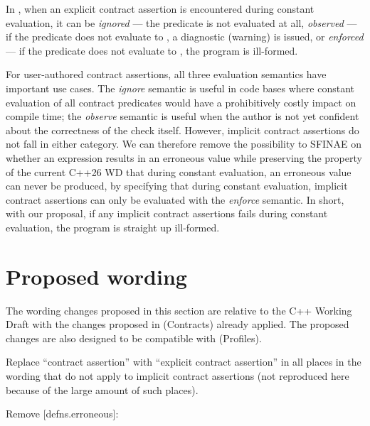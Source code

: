 In \cite{P2900R13}, when an explicit contract assertion is encountered during constant evaluation, it can be \emph{ignored} --- the predicate is not evaluated at all, \emph{observed} --- if the predicate does not evaluate to , a diagnostic (warning) is issued, or \emph{enforced} --- if the predicate does not evaluate to , the program is ill-formed.

For user-authored contract assertions, all three evaluation semantics have important use cases. The \emph{ignore} semantic is useful in code bases where constant evaluation of all contract predicates would have a prohibitively costly impact on compile time; the \emph{observe} semantic is useful when the author is not yet confident about the correctness of the check itself. However, implicit contract assertions do not fall in either category. We can therefore remove the possibility to SFINAE on whether an expression results in an erroneous value while preserving the property of the current C++26 WD that during constant evaluation, an erroneous value can never be produced, by specifying that during constant evaluation, implicit contract assertions can only be evaluated with the \emph{enforce} semantic. In short, with our proposal, if any implicit contract assertions fails during constant evaluation, the program is straight up ill-formed.

\section{Proposed wording}

The wording changes proposed in this section are relative to the C++ Working Draft \cite{N5001} with the changes proposed in \cite{P2900R13} (Contracts) already applied. The proposed changes are also designed to be compatible with \cite{P3081R1} (Profiles).


Replace ``contract assertion'' with ``explicit contract assertion'' in all places in the wording that do not apply to implicit contract assertions (not reproduced here because of the large amount of such places).

Remove [defns.erroneous]:

